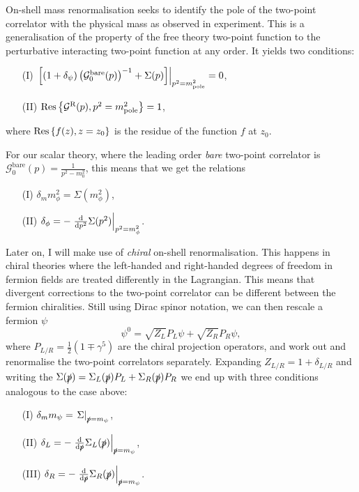 \documentclass[../main.tex]{subfiles}
\begin{document}
On-shell mass renormalisation seeks to identify the pole of the two-point correlator with the physical mass as observed in experiment.
This is a generalisation of the property of the free theory two-point function to the perturbative interacting two-point function at any order.
It yields two conditions:
\begin{center}
  \begin{itemize}
    \item [(I)] \(\evalat{\bclosed{(1+\delta_\psi)\pclosed{\mathcal{G}^\text{bare}_0(p)}^{-1}
              + \Sigma(p)}}{p^2 = m_\text{pole}^2} = 0\),
    \item [(II)] \(\operatorname{Res}\cclosed{\mathcal{G}^\text{R}(p), p^2
            = m_\text{pole}^2} = 1\),
  \end{itemize}
\end{center}
where \(\operatorname{Res}\cclosed{f(z), z = z_0}\) is the residue of the
function \(f\) at \(z_0\).
\medskip

For our scalar theory, where the leading order \emph{bare} two-point correlator is
\(\mathcal{G}_0^\text{bare}(p) =\frac{1}{p^2 - m_0^2}\), this means that we get the
relations
\begin{center}
  \begin{itemize}
    \item [(I)] \(\delta_m m_\phi^2 = \Sigma(m_\phi^2)\),
    \item [(II)] \(\delta_\phi = -\evalat{\d[p^2]{}\Sigma(p^2)}{p^2 =
            m_\phi^2}\).
  \end{itemize}
\end{center}
\medskip

Later on, I will make use of \emph{chiral} on-shell renormalisation.
This happens in chiral theories where the left-handed and right-handed degrees of freedom in fermion fields are treated differently in the Lagrangian.
This means that divergent corrections to the two-point correlator can be different between the fermion chiralities.
Still using Dirac spinor notation, we can then rescale a fermion \(\psi\)
\begin{equation}
  \psi^0 = \sqrt{Z_L} P_L \psi + \sqrt{Z_R} P_R \psi,
\end{equation}
where \(P_{L/R} = \frac{1}{2}(1 \mp \gamma^5)\) are the chiral projection operators, and work out and renormalise the two-point correlators separately.
Expanding \(Z_{L/R} = 1 + \delta_{L/R}\) and writing the \(\Sigma(\slashed{p}) = \Sigma_L(\slashed{p})P_L + \Sigma_R(\slashed{p})P_R\) we end up with three conditions analogous to the case above:
\begin{center}
  \begin{itemize}
    \item [(I)] \(\delta_m m_\psi = \evalat{\Sigma}{\slashed{p}=m_\psi}\),
    \item [(II)] \(\delta_L = -\evalat{\d[\slashed{p}]{}\Sigma_L(\slashed{p})}{\slashed{p} = m_\psi}\),
    \item [(III)] \(\delta_R = -\evalat{\d[\slashed{p}]{}\Sigma_R(\slashed{p})}{\slashed{p} = m_\psi}\).
  \end{itemize}
\end{center}
\end{document}
